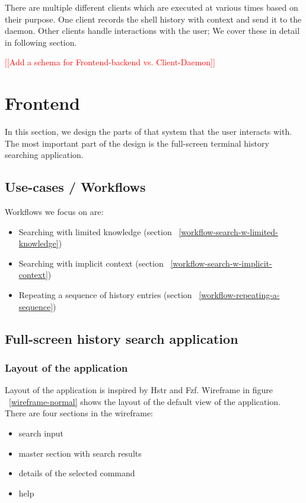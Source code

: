\documentclass[thesis=M,english]{FITthesis}[2012/10/20]
\newcommand{\redtext}[1]{\textcolor{red}{[[#1]]}}
\let\myRef\ref
\renewcommand\ref{\unskip~\myRef}
\begin{document}
There are multiple different clients which are executed at various times based on their purpose.
One client records the shell history with context and send it to the daemon. Other clients handle interactions with the user; We cover these in detail in following section.

\redtext{Add a schema for Frontend-backend vs. Client-Daemon}

\section{Frontend}\label{frontend}

In this section, we design the parts of that system that the user interacts with.
The most important part of the design is the full-screen terminal history searching application. 

\subsection{Use-cases / Workflows}

Workflows we focus on are:
\begin{itemize}
    \item Searching with limited knowledge (section \ref{workflow-search-w-limited-knowledge})
    \item Searching with implicit context (section \ref{workflow-search-w-implicit-context})
    \item Repeating a sequence of history entries (section \ref{workflow-repeating-a-sequence})
\end{itemize}

\subsection{Full-screen history search application}

\subsubsection{Layout of the application}

Layout of the application is inspired by Hstr and Fzf. Wireframe in figure \ref{wireframe-normal} shows the layout of the default view of the application. There are four sections in the wireframe:

\begin{itemize}
    \item search input
    \item master section with search results
    \item details of the selected command
    \item help 
\end{itemize}
\end{document}
